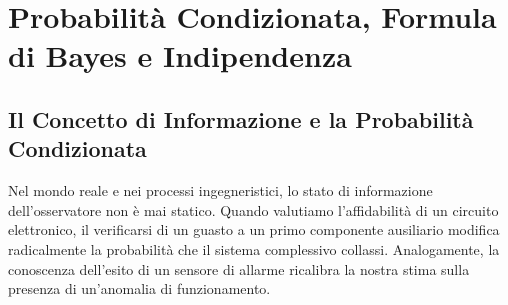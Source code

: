 \chapter{Probabilità Condizionata, Formula di Bayes e Indipendenza}
\label{cap:indipendenza_e_probabilita_condizionata}

\begin{abstract}
Il presente capitolo esplora il cuore dinamico della teoria delle probabilità: l'aggiornamento razionale delle credenze e delle previsioni a fronte dell'acquisizione di nuova evidenza sperimentale o informativa. Viene formalizzata la probabilità condizionata come restrizione geometrica dello spazio campionario e si derivano la regola moltiplicativa e la formula a catena. Si dimostrano analiticamente il Teorema delle Probabilità Totali e il celebre Teorema di Bayes, pilastro dell'inferenza statistica moderna e del decision making razionale. Viene approfondito il paradosso dei falsi positivi nei test diagnostici e nei controlli di qualità industriale. Infine, si analizza la nozione di indipendenza stocastica, evidenziandone la netta cesura logica rispetto all'incompatibilità insiemistica e sviscerando la distinzione tra indipendenza a due a due e mutua indipendenza globale.
\end{abstract}

\section{Il Concetto di Informazione e la Probabilità Condizionata}
\label{sec:prob_condizionata_intro}

Nel mondo reale e nei processi ingegneristici, lo stato di informazione dell'osservatore non è mai statico. Quando valutiamo l'affidabilità di un circuito elettronico, il verificarsi di un guasto a un primo componente ausiliario modifica radicalmente la probabilità che il sistema complessivo collassi. Analogamente, la conoscenza dell'esito di un sensore di allarme ricalibra la nostra stima sulla presenza di un'anomalia di funzionamento.

